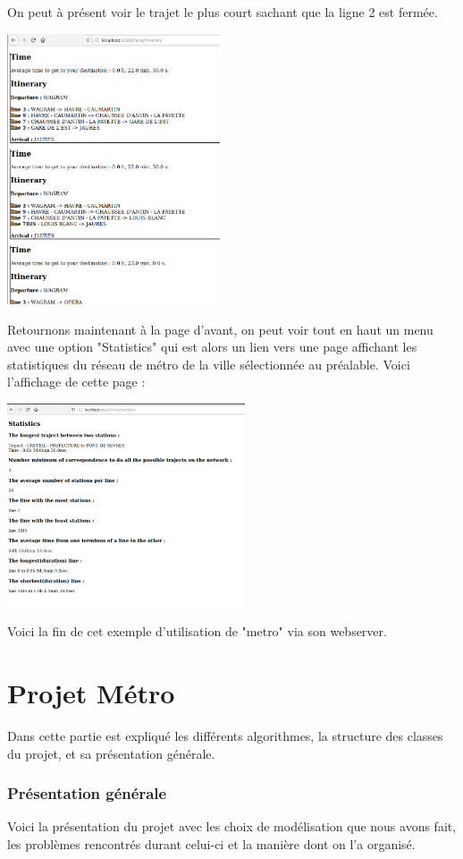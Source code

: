 \documentclass[french, 12pt]{article}
\begin{document}
On peut à présent voir le trajet le plus court sachant que la ligne 2 est fermée.

\includegraphics[height=8cm]{images/resultswithpert.png}

Retournons maintenant à la page d'avant, on peut voir tout en haut un menu avec une option "Statistics" qui est alors un lien vers une page affichant les statistiques du réseau de métro de la ville sélectionnée au préalable.
Voici l'affichage de cette page :

\includegraphics[height=6cm]{images/stat.png}

Voici la fin de cet exemple d'utilisation de "metro" via son webserver.



\newpage

\part{Projet Métro}
Dans cette partie est expliqué les différents algorithmes, la structure des classes du  projet, et sa présentation générale.
\section{Présentation générale}
Voici la présentation du projet avec les choix de modélisation que nous avons fait, les problèmes rencontrés durant celui-ci et la manière dont on l'a organisé.
\end{document}
